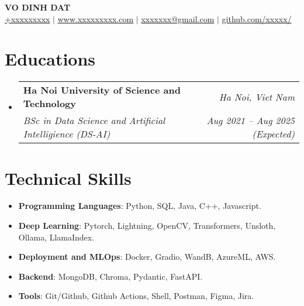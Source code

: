 \documentclass[letterpaper,11pt]{article}
\makeatletter
\newcommand{\resumeitem}[1]{
  \item\small{
    #1 \vspace{-2pt}
  }
}
\newcommand{\resumeSubheading}[4]{
  \vspace{-1pt}\item
    \begin{tabular*}{0.97\textwidth}[t]{l@{\extracolsep{\fill}}r}
      \textbf{#1} & \textit{#2} \\
      \textit{\small#3} & \textit{\small #4} \\
    \end{tabular*}\vspace{-6pt}
}
\newcommand{\resumeSubHeadingListStart}{\begin{itemize}[leftmargin=*,label={}]}
\newcommand{\resumeSubHeadingListEnd}{\end{itemize}}
\newcommand{\resumeItemListStart}{\begin{itemize}}
\newcommand{\resumeItemListEnd}{\end{itemize}\vspace{-5pt}}
\makeatother
\begin{document}

\begin{center}
  \textbf{\LARGE {VO DINH DAT}} \\ \vspace{1pt}
  \href{tel:+xxxxxxxxx}{{+xxxxxxxxx}} $|$ \href{https://xxxxxx.com}{{www.xxxxxxxxx.com}}
  $|$ \href{mailto:xxxxxxxx@gmail.com}{{xxxxxxx@gmail.com}} $|$ 
  \href{https://github.com/in/xxxxxxx/}{{github.com/xxxxx/}}
  
\end{center}

\section{Educations}
  \resumeSubHeadingListStart
    \resumeSubheading
      {Ha Noi University of Science and Technology}{\textit{Ha Noi, Viet Nam}}
      {BSc in Data Science and Artificial Intelligience (DS-AI)}{Aug 2021 -- Aug 2025 (Expected)}
  \resumeSubHeadingListEnd

  
  \section{Technical Skills}
\resumeItemListStart[leftmargin=*,label={}]
  \resumeitem{\textbf{Programming Languages}: {Python, SQL, Java, C++, Javascript.}} \\[-\baselineskip]
  \resumeitem{\textbf{Deep Learning}: {Pytorch, Lightning, OpenCV, Transformers, Unsloth, Ollama, LlamaIndex.}} \\[-\baselineskip]
  \resumeitem{\textbf{Deployment and MLOps}: {Docker, Gradio, WandB, AzureML, AWS.}} \\[-\baselineskip]
  \resumeitem{\textbf{Backend}: {MongoDB, Chroma, Pydantic, FastAPI.}} \\[-\baselineskip]
  \resumeitem{\textbf{Tools}: {Git/Github, Github Actions, Shell, Postman, Figma, Jira.}}\\[-\baselineskip]
\resumeItemListEnd
\end{document}
